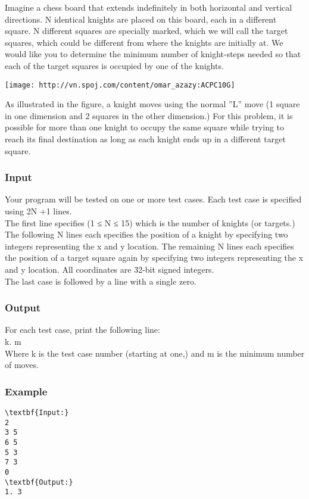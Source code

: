 

Imagine a chess board that extends indefinitely in both horizontal and vertical directions. N identical knights are placed on this board, each in a different square. N different squares are specially marked, which we will call the target squares, which could be different from where the knights are initially at. We would like you to determine the minimum number of knight-steps needed so that each of the target squares is occupied by one of the knights.


\texttt{[image: http://vn.spoj.com/content/omar\_azazy:ACPC10G]}

As illustrated in the figure, a knight moves using the normal ”L” move (1 square in one dimension and 2 squares in the other dimension.) For this problem, it is possible for more than one knight to occupy the same square while trying to reach its final destination as long as each knight ends up in a different target square.

\subsubsection{Input}

Your program will be tested on one or more test cases. Each test case is specified using 2N +1 lines.
\\The first line specifies (1 ≤ N ≤ 15) which is the number of knights (or targets.) The following N lines each specifies the position of a knight by specifying two integers representing the x and y location. The remaining N lines each specifies the position of a target square again by specifying two integers representing the x and y location. All coordinates are 32-bit signed integers.
\\The last case is followed by a line with a single zero.

\subsubsection{Output}

For each test case, print the following line:
\\k. m
\\Where k is the test case number (starting at one,) and m is the minimum number of moves.

\subsubsection{Example}
\begin{verbatim}
\textbf{Input:}
2
3 5
6 5
5 3
7 3
0
\textbf{Output:}
1. 3\end{verbatim}